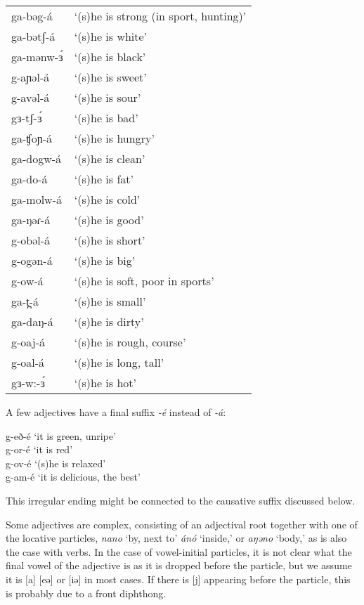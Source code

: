 \ea	\begin{tabular}[t]{ll}
	ga-bəg-á		& ‘(s)he is strong (in sport, hunting)’\\
	ga-bətʃ-á	& ‘(s)he is white’	\\ %
	ga-mənw-ɜ́	& ‘(s)he is black’\\
	g-aɲəl-á	 & ‘(s)he is sweet’\\
	g-avəl-á	& ‘(s)he is sour’\\
	gɜ-tʃ-ɜ́	     & ‘(s)he is bad’\\
	ga-ʧoɲ-á	& ‘(s)he is hungry’\\
	ga-dogw-á	& ‘(s)he is clean’\\
	ga-do-á		& ‘(s)he is fat’\\
	ga-molw-á 	& ‘(s)he is cold’\\
	ga-ŋəɾ-á	& ‘(s)he is good’\\
	g-obəl-á	& ‘(s)he is short’\\
	g-ogən-á	& ‘(s)he is big’ \\
	g-ow-á	& ‘(s)he is soft, poor in sports’ \\  %
	ga-t̪-á	& ‘(s)he is small’\\
	ga-daŋ-á	& ‘(s)he is dirty’\\
	g-oaj-á	& ‘(s)he is rough, course’\\
	g-oal-á	& ‘(s)he is long, tall’\\
	gɜ-w:-ɜ́	& ‘(s)he is hot’\\
\end{tabular}
\z

A few adjectives have a final suffix \textit{-é} instead of \textit{-á}:

\ea	g-eð-é	‘it is green, unripe’\\
 	g-or-é	‘it is red’\\
	g-ov-é	‘(s)he is relaxed’\\
	g-am-é	‘it is delicious, the best’\\
\z 
		
This irregular ending might be connected to the causative suffix discussed below. 

Some adjectives are complex, consisting of an adjectival root together with one of the locative particles, \textit{nano} `by, next to' \textit{ánó} `inside,' or \textit{aŋəno} `body,' as is also the case with verbs. In the case of vowel-initial particles, it is not clear what the final vowel of the adjective is as it is dropped before the particle, but we assume it is [a] [eə] or [iə] in most cases. If there is [j] appearing before the particle, this is probably due to a front diphthong. 

